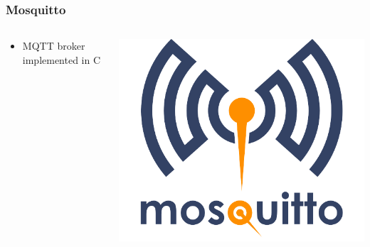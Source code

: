 \documentclass[aspectratio=169,11pt,hyperref={colorlinks=true}]{beamer}
\begin{document}
\begin{frame}
    \frametitle{Mosquitto}
    \begin{columns}[T]
        \begin{column}{.48\textwidth}
            \begin{itemize}
                \item MQTT broker implemented in C
            \end{itemize}
        \end{column}
        \begin{column}{.48\textwidth}
            \includegraphics[width=\textwidth]{mosquitto.png}
        \end{column}
    \end{columns}
\end{frame}
\end{document}

